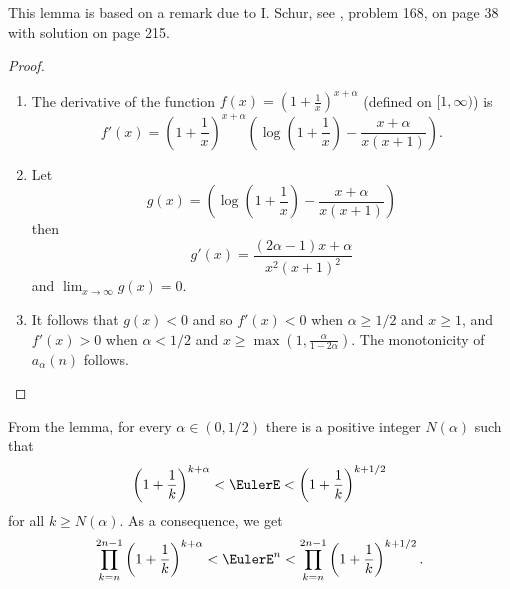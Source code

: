 \documentclass[12pt]{article}
\begin{document}
\begin{remark}
    This lemma is based on a remark due to I. Schur, see
    \cite{polya98}, problem 168, on page 38 with solution on page 215.
\end{remark}

\begin{proof}
    \begin{enumerate}
        \item
            The derivative of the function \( f(x) = \left( 1 + \frac{1}
            {x} \right)^{x + \alpha} \) (defined on \( [1, \infty) \))
            is
            \[
                f'(x) = \left( 1 + \frac{1}{x} \right)^{x + \alpha}
                \left( \log\left( 1 + \frac{1}{x} \right) - \frac{x+\alpha}
                {x(x+1)} \right).
            \]
        \item
            Let
            \[
                g(x) = \left( \log\left( 1 + \frac{1}{x} \right) - \frac{x+\alpha}
                {x(x+1)} \right)
            \] then
            \[
                g'(x) = \frac{(2\alpha -1) x + \alpha}{x^2(x+1)^2}
            \] and \( \lim_{x \to \infty} g(x) = 0 \).
        \item
            It follows that \( g(x) < 0 \) and so \( f'(x) < 0 \) when \(
            \alpha \ge 1/2 \) and \( x \ge 1 \), and \( f'(x) > 0 \)
            when \( \alpha < 1/2 \) and \( x \ge \max(1, \frac{\alpha}{1
            - 2\alpha} ) \).  The monotonicity of \( a_{\alpha}(n) \)
            follows.
    \end{enumerate}
\end{proof}

From the lemma, for every \( \alpha \in (0, 1/2) \) there is a positive
integer \( N(\alpha) \) such that
\[
    \left( 1 + \frac{1}{k} \right)^{k + \alpha} < \EulerE < \left( 1 +
    \frac{1}{k} \right)^{k + 1/2}
\] for all \( k \ge N(\alpha) \).  As a consequence, we get
\[
    \prod_{k=n}^{2n-1} \left( 1 + \frac{1}{k} \right)^{k + \alpha} <
    \EulerE^n < \prod_{k=n}^{2n-1} \left( 1 + \frac{1}{k} \right)^{k +
    1/2}.
\]
\end{document}
